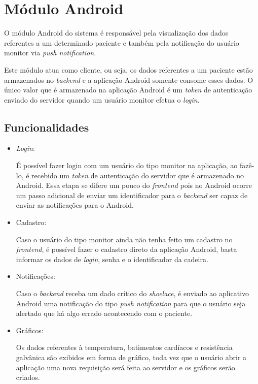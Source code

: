 \section{Módulo Android}

O módulo Android do sistema é responsável pela visualização dos dados referentes a um
determinado paciente e também pela notificação do usuário monitor via 
\textit{push notification}.

Este módulo atua como cliente, ou seja, os dados referentes a um paciente estão armazenados
no \textit{backend} e a aplicação Android somente consome esses dados. O único valor que é
armazenado na aplicação Android é um \textit{token} de autenticação enviado do servidor quando
um usuário monitor efetua o \textit{login}.

\subsection{Funcionalidades}

\begin{itemize}

\item \textit{Login}:

É possível fazer login com um usuário do tipo monitor na aplicação, ao fazê-lo, é recebido um
\textit{token} de autenticação do servidor que é armazenado no Android. Essa etapa se difere
um pouco do \textit{frontend} pois no Android ocorre um passo adicional de enviar um
identificador para o \textit{backend} ser capaz de enviar as notificações para o Android.

\item Cadastro:

Caso o usuário do tipo monitor ainda não tenha feito um cadastro no \textit{frontend}, é
possível fazer o cadastro direto da aplicação Android, basta informar os dados de 
\textit{login}, senha e o identificador da cadeira.

\item Notificações:

Caso o \textit{backend} receba um dado crítico do \textit{shoelace}, é enviado ao aplicativo
Android uma notificação do tipo \textit{push notification} para que o usuário seja alertado
que há algo errado acontecendo com o paciente.

\item Gráficos:

Os dados referentes à temperatura, batimentos cardíacos e resistência galvânica são exibidos
em forma de gráfico, toda vez que o usuário abrir a aplicação uma nova requisição será feita
ao servidor e os gráficos serão criados.

\end{itemize}

